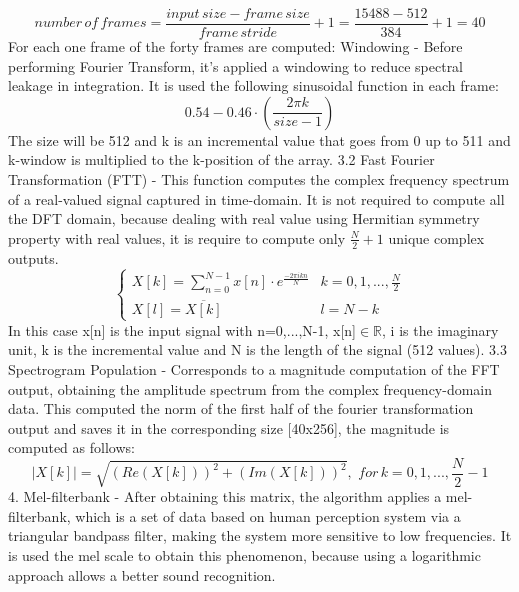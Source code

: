 \begin{equation}
    number\,of\,frames=\frac{input\,size-frame\,size}{frame\,stride}+1=\frac{15488-512}{384}+1=40
\end{equation}
For each one frame of the forty frames are computed:\newline{} Windowing - Before performing Fourier Transform, it's applied a windowing to reduce spectral leakage in integration. It is used the following sinusoidal function in each frame:\newline
\begin{equation}
    0.54-0.46\cdot(\frac{2\pi k}{size-1})
\end{equation}
The size will be 512 and k is an incremental value that goes from 0 up to 511 and k-window is multiplied to the k-position of the array.
3.2 Fast Fourier Transformation (FTT) - This function computes the complex frequency spectrum of a real-valued signal captured in time-domain. It is not required to compute all the DFT domain, because dealing with real value using Hermitian symmetry property with real values, it is require to compute only $\frac{N}{2}+1$ unique complex outputs. 
\begin{equation}
    \begin{cases} 
        X[k]=\sum_{n=0}^{N-1}x[n]\cdot e^{\frac{-2\pi ikn}{N}} & k=0,1,...,\frac{N}{2}\\
        X[l]=\overline{X[k]} & l=N-k
    \end{cases}
\end{equation}
In this case x[n] is the input signal with n=0,...,N-1, x[n]$\in\mathbb{R}$, i is the imaginary unit, k is the incremental value and N is the length of the signal (512 values).
3.3 Spectrogram Population - Corresponds to a magnitude computation of the FFT output, obtaining the amplitude spectrum from the complex frequency-domain data. This computed the norm of the first half of the fourier transformation output and saves it in the corresponding size [40x256], the magnitude is computed as follows:
\begin{equation}
    |X[k]|=\sqrt{(Re(X[k]))^2+(Im(X[k]))^2},\,\,for\,k=0,1,...,\frac{N}{2}-1
\end{equation} 
4. Mel-filterbank - After obtaining this matrix, the algorithm applies a mel-filterbank, which is a set of data based on human perception system via a triangular bandpass filter, making the system more sensitive to low frequencies. It is used the mel scale to obtain this phenomenon, because using a logarithmic approach allows a better sound recognition.\newline
